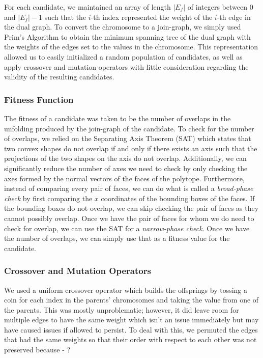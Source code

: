 \documentclass[conference]{IEEEtran}
\begin{document}
For each candidate, we maintained an array of length $|E_f|$ of integers between 0 and $|E_f| - 1$ such that the $i$-th index represented the weight of the $i$-th edge in the dual graph. To convert the chromosome to a join-graph, we simply used Prim's Algorithm to obtain the minimum spanning tree of the dual graph with the weights of the edges set to the values in the chromosome. This representation allowed us to easily initialized a random population of candidates, as well as apply crossover and mutation operators with little consideration regarding the validity of the resulting candidates.

\subsubsection{Fitness Function}
The fitness of a candidate was taken to be the number of overlaps in the unfolding produced by the join-graph of the candidate. To check for the number of overlaps, we relied on the Separating Axis Theorem (SAT) which states that two convex shapes do not overlap if and only if there exists an axis such that the projections of the two shapes on the axis do not overlap. Additionally, we can significantly reduce the number of axes we need to check by only checking the axes formed by the normal vectors of the faces of the polytope. Furthermore, instead of comparing every pair of faces, we can do what is called a \emph{broad-phase check} by first comparing the $x$ coordinates of the bounding boxes of the faces. If the bounding boxes do not overlap, we can skip checking the pair of faces as they cannot possibly overlap. Once we have the pair of faces for whom we do need to check for overlap, we can use the SAT for a \emph{narrow-phase check}. Once we have the number of overlaps, we can simply use that as a fitness value for the candidate.

\subsubsection{Crossover and Mutation Operators}

We used a uniform crossover operator which builds the offsprings by tossing a coin for each index in the parents' chromosomes and taking the value from one of the parents. This was mostly unproblematic; however, it did leave room for multiple edges to have the same weight which isn't an issue immediately but may have caused issues if allowed to persist. To deal with this, we permuted the edges that had the same weights so that their order with respect to each other was not preserved because - ?
\end{document}
